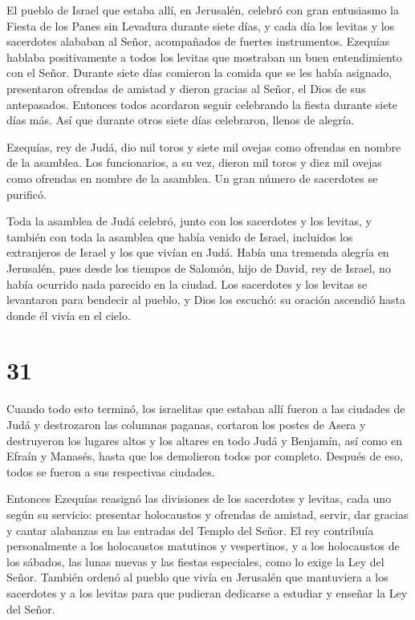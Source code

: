  El pueblo de Israel que estaba allí, en Jerusalén, celebró
con gran entusiasmo la Fiesta de los Panes sin Levadura durante siete
días, y cada día los levitas y los sacerdotes alababan al Señor,
acompañados de fuertes instrumentos.  Ezequías hablaba
positivamente a todos los levitas que mostraban un buen entendimiento
con el Señor. Durante siete días comieron la comida que se les había
asignado, presentaron ofrendas de amistad y dieron gracias al Señor, el
Dios de sus antepasados.  Entonces todos acordaron seguir
celebrando la fiesta durante siete días más. Así que durante otros siete
días celebraron, llenos de alegría.

 Ezequías, rey de Judá, dio mil toros y siete mil ovejas
como ofrendas en nombre de la asamblea. Los funcionarios, a su vez,
dieron mil toros y diez mil ovejas como ofrendas en nombre de la
asamblea. Un gran número de sacerdotes se purificó.

 Toda la asamblea de Judá celebró, junto con los sacerdotes
y los levitas, y también con toda la asamblea que había venido de
Israel, incluidos los extranjeros de Israel y los que vivían en Judá.
 Había una tremenda alegría en Jerusalén, pues desde los
tiempos de Salomón, hijo de David, rey de Israel, no había ocurrido nada
parecido en la ciudad.  Los sacerdotes y los levitas se
levantaron para bendecir al pueblo, y Dios los escuchó: su oración
ascendió hasta donde él vivía en el cielo.

\hypertarget{section-30}{%
\section{31}\label{section-30}}

 Cuando todo esto terminó, los israelitas que estaban allí
fueron a las ciudades de Judá y destrozaron las columnas paganas,
cortaron los postes de Asera y destruyeron los lugares altos y los
altares en todo Judá y Benjamín, así como en Efraín y Manasés, hasta que
los demolieron todos por completo. Después de eso, todos se fueron a sus
respectivas ciudades.

 Entonces Ezequías reasignó las divisiones de los sacerdotes
y levitas, cada uno según su servicio: presentar holocaustos y ofrendas
de amistad, servir, dar gracias y cantar alabanzas en las entradas del
Templo del Señor.  El rey contribuía personalmente a los
holocaustos matutinos y vespertinos, y a los holocaustos de los sábados,
las lunas nuevas y las fiestas especiales, como lo exige la Ley del
Señor.  También ordenó al pueblo que vivía en Jerusalén que
mantuviera a los sacerdotes y a los levitas para que pudieran dedicarse
a estudiar y enseñar la Ley del Señor.

